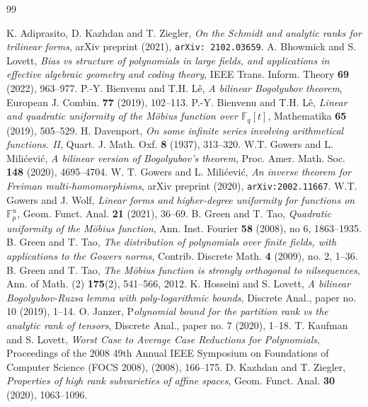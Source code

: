 \documentclass[a4paper,11pt]{article}
\theoremstyle{definition}
\renewenvironment{thebibliography}[1]
{
  \begin{oldthebibliography}{#1}
    \setlength{\itemsep}{0em  plus 0.3ex}
    \setlength{\parskip}{0em}
}
{
  \end{oldthebibliography}
}
\begin{document}
\begin{thebibliography}{99}
 K. Adiprasito, D. Kazhdan and T. Ziegler, \textit{On the Schmidt and analytic ranks for trilinear forms}, arXiv preprint (2021), \verb+arXiv: 2102.03659+.
     A. Bhowmick and S. Lovett, \textit{Bias vs structure of polynomials in large fields, and applications in effective algebraic geometry and coding theory}, IEEE Trans. Inform. Theory \textbf{69} (2022), 963--977.
     P.-Y. Bienvenu and T.H. L\^{e}, \emph{A bilinear Bogolyubov theorem}, European J. Combin. \textbf{77} (2019), 102--113.
     P.-Y. Bienvenu and T.H. L\^{e}, \emph{Linear and quadratic uniformity of the M\"obius function over $\mathbb{F}_{q}[t]$}, Mathematika \textbf{65} (2019), 505--529.
     H. Davenport, \textit{On some infinite series involving arithmetical functions. II}, Quart. J. Math. Oxf. \textbf{8} (1937), 313--320.
     W.T. Gowers and L. Mili\'cevi\'c, \emph{A bilinear version of Bogolyubov's theorem}, Proc. Amer. Math. Soc. \textbf{148} (2020), 4695--4704.
     W. T. Gowers and L. Milićević, \emph{An inverse theorem for Freiman multi-homomorphisms}, arXiv preprint (2020), \verb+arXiv:2002.11667+.
     W.T. Gowers and J. Wolf, \textit{Linear forms and higher-degree uniformity for functions on $\mathbb{F}_p^n$}, Geom. Funct. Anal. \textbf{21} (2021), 36--69.
     B. Green and T. Tao, \textit{Quadratic uniformity of the M\"obius function}, Ann. Inst. Fourier \textbf{58} (2008), no 6, 1863--1935.
     B. Green and T. Tao, \textit{The distribution of polynomials over finite fields, with applications to the Gowers norms}, Contrib. Discrete Math. \textbf{4} (2009), no. 2, 1--36.
    B. Green and T. Tao, \textit{The M\"obius function is strongly orthogonal to nilsequences}, Ann. of Math. (2) \textbf{175}(2), 541--566, 2012.
     K. Hosseini and S. Lovett, \emph{A bilinear Bogolyubov-Ruzsa lemma with poly-logarithmic bounds}, Discrete Anal., paper no. 10 (2019), 1--14.
     O. Janzer, P\textit{olynomial bound for the partition rank vs the analytic rank of tensors}, Discrete Anal., paper no. 7 (2020), 1--18.
     T. Kaufman and S. Lovett, \textit{Worst Case to Average Case Reductions for Polynomials}, Proceedings of the 2008 49th Annual IEEE Symposium on Foundations of Computer Science (FOCS 2008), (2008), 166--175.
     D. Kazhdan and T. Ziegler, \textit{Properties of high rank subvarieties of affine spaces}, Geom. Funct. Anal. \textbf{30} (2020), 1063--1096.

\end{thebibliography}
\end{document}
